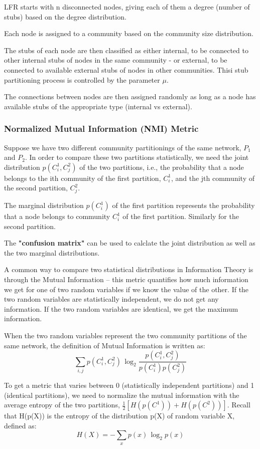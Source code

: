 \documentclass[11pt]{scrartcl} %
\begin{document}
LFR starts with n disconnected nodes, giving each of them a degree (number of stubs) based on the degree distribution.

Each node is assigned to a community based on the community size distribution.

The stubs of each node are then classified as either internal, to be connected to other internal stubs of nodes in the same community - or external, to be connected to available external stubs of nodes in other communities. Thisi stub partitioning process is controlled by the parameter $\mu$.

The connections between nodes are then assigned randomly as long as a node has available stubs of the appropriate type (internal vs external).

\subsubsection{Normalized Mutual Information (NMI) Metric}
Suppose we have two different community partitionings of the same network, $P_1$ and $P_2$. In order to compare these two partitions statistically, we need the joint distribution $p(C^1_i,C^2_j)$ of the two partitions, i.e., the probability that a node belongs to the ith community of the first partition, $C^1_i$, and the jth community of the second partition, $C^2_j$.

The marginal distribution $p(C^1_i)$ of the first partition represents the probability that a node belongs to community $C^1_i$ of the first partition. Similarly for the second partition.

The \textbf{"confusion matrix"} can be used to calclate the joint distribution as well as the two marginal distributions.

A common way to compare two statistical distributions in Information Theory is through the Mutual Information – this metric quantifies how much information we get for one of two random variables if we know the value of the other. If the two random variables are statistically independent, we do not get any information. If the two random variables are identical, we get the maximum information. 

When the two random variables represent the two community partitions of the same network, the definition of Mutual Information is written as: 
\[ \sum_{i,j} p(C^1_i, C^2_j) \, \log_2 \frac{p(C^1_i, C^2_j) }{p(C^1_i) p(C^2_j)} \]

To get a metric that varies between 0 (statistically independent partitions) and 1 (identical partitions), we need to normalize the mutual information with the average entropy of the two partitions, $\frac{1}{2} [H(p(C^1)) + H(p(C^2))]$. Recall that H(p(X)) is the entropy of the distribution p(X) of random variable X, defined as: 
\[ H(X) = - \sum_x p(x) \, \log_2 p(x) \]
\end{document}
